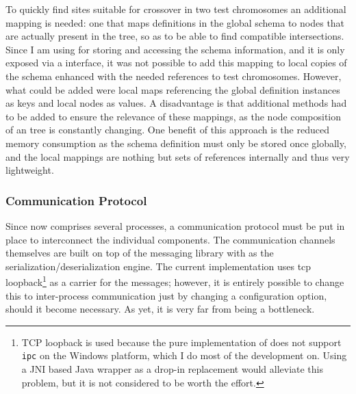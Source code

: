 To quickly find sites suitable for crossover in two test chromosomes an additional mapping is needed: 
one that maps definitions in the global schema to nodes that are actually present in the \xml tree, so 
as to be able to find compatible intersections.
Since I am using \xerces for storing and accessing the schema information, and it is only exposed via 
a \java interface, it was not possible to add this mapping to local copies of the schema  
enhanced with the needed references to test chromosomes. However, what could be added were local 
maps referencing the global definition instances as keys and local nodes as values. A disadvantage 
is that additional methods had to be added to ensure the relevance of these mappings, 
as the node composition of an \xml tree is constantly changing. 
One benefit of this approach is the reduced memory consumption as the schema
definition must only be stored once globally, and the local mappings are nothing but sets of references 
internally and thus very lightweight.
\subsubsection{Communication Protocol}
Since \xmlmate now comprises several processes, a communication protocol must be put in place to 
interconnect the individual components. The communication channels themselves are built on top of
the \zmq messaging library with \msgpack as the serialization/deserialization engine. The current
implementation uses tcp loopback\footnote{TCP loopback is used because the pure \java implementation 
of \zmq does not support \texttt{ipc} on the Windows platform, which I do most of the development on.
Using a JNI based Java wrapper as a drop-in replacement would alleviate this problem, 
but it is not considered to be worth the effort.} 
as a carrier for the messages; however, it is entirely possible
to change this to inter-process communication just by changing a configuration option, should it 
become necessary. As yet, it is very far from being a bottleneck.


